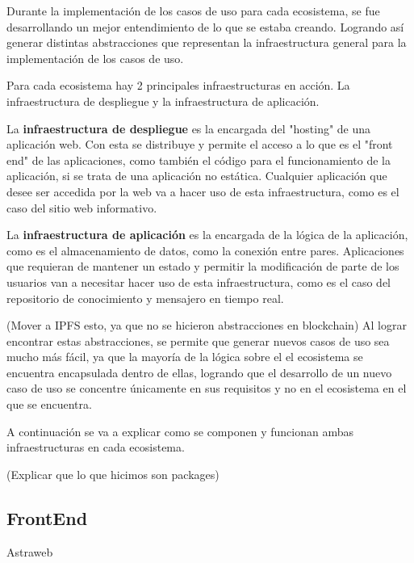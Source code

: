 Durante la implementación de los casos de uso para cada ecosistema, se fue desarrollando un mejor entendimiento de lo que se estaba creando. Logrando así generar distintas abstracciones que representan la infraestructura general para la implementación de los casos de uso.

Para cada ecosistema hay 2 principales infraestructuras en acción. La infraestructura de despliegue y la infraestructura de aplicación.

La \textbf{infraestructura de despliegue} es la encargada del "hosting" de una aplicación web. Con esta se distribuye y permite el acceso a lo que es el "front end" de las aplicaciones, como también el código para el funcionamiento de la aplicación, si se trata de una aplicación no estática. Cualquier aplicación que desee ser accedida por la web va a hacer uso de esta infraestructura, como es el caso del sitio web informativo.

La \textbf{infraestructura de aplicación} es la encargada de la lógica de la aplicación, como es el almacenamiento de datos, como la conexión entre pares. Aplicaciones que requieran de mantener un estado y permitir la modificación de parte de los usuarios van a necesitar hacer uso de esta infraestructura, como es el caso del repositorio de conocimiento y mensajero en tiempo real.

(Mover a IPFS esto, ya que no se hicieron abstracciones en blockchain) Al lograr encontrar estas abstracciones, se permite que generar nuevos casos de uso sea mucho más fácil, ya que la mayoría de la lógica sobre el el ecosistema se encuentra encapsulada dentro de ellas, logrando que el desarrollo de un nuevo caso de uso se concentre únicamente en sus requisitos y no en el ecosistema en el que se encuentra.

A continuación se va a explicar como se componen y funcionan ambas infraestructuras en cada ecosistema.

(Explicar que lo que hicimos son packages)




\subsection{FrontEnd}

Astraweb